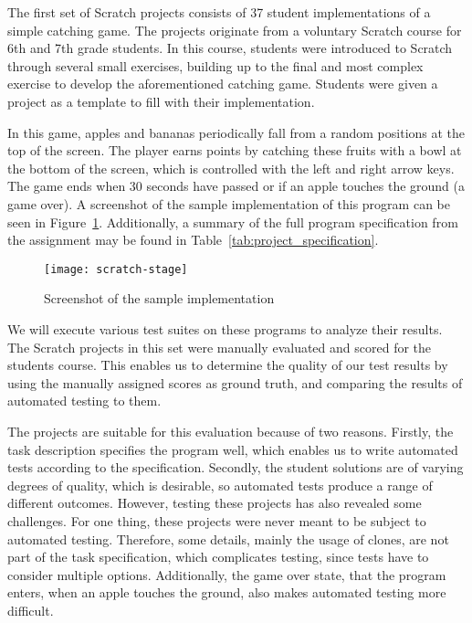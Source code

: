 The first set of Scratch projects consists of 37 student implementations of a simple catching game.
The projects originate from a voluntary Scratch course for 6th and 7th grade students.
In this course, students were introduced to Scratch through several small exercises,
building up to the final and most complex exercise to develop the aforementioned catching game.
Students were given a project as a template to fill with their implementation.
\parspace

In this game, apples and bananas periodically fall from a random positions at the top of the screen.
The player earns points by catching these fruits with a bowl at the bottom of the screen,
which is controlled with the left and right arrow keys.
The game ends when 30 seconds have passed or if an apple touches the ground (a game over).
A screenshot of the sample implementation of this program can be seen in Figure~\ref{fig:screenshot_of_the_sample_implementation}.
Additionally, a summary of the full program specification from the assignment may be found in Table~\ref{tab:project_specification}.
\parspace

\begin{figure}[htpb]
    \centering
    \texttt{[image: scratch-stage]}
    \caption{Screenshot of the sample implementation}
    \label{fig:screenshot_of_the_sample_implementation}
\end{figure}

We will execute various test suites on these programs to analyze their results.
The Scratch projects in this set were manually evaluated and scored for the students course.
This enables us to determine the quality of our test results by using the manually assigned scores as ground truth,
and comparing the results of automated testing to them.
\parspace

The projects are suitable for this evaluation because of two reasons.
Firstly, the task description specifies the program well, which enables us to write automated tests according to the specification.
Secondly, the student solutions are of varying degrees of quality,
which is desirable, so automated tests produce a range of different outcomes.
However, testing these projects has also revealed some challenges.
For one thing, these projects were never meant to be subject to automated testing.
Therefore, some details, mainly the usage of clones,
are not part of the task specification, which complicates testing,
since tests have to consider multiple options.
Additionally, the game over state, that the program enters,
when an apple touches the ground, also makes automated testing more difficult.
\parspace

